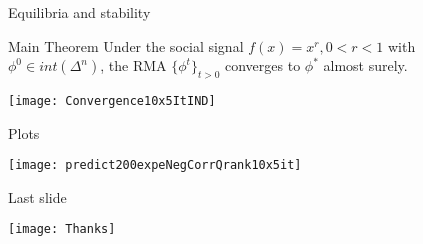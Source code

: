 
\begin{frame}[c]{Equilibria and stability}
\begin{exampleblock}{Main Theorem} 
\label{thm:ict} 
Under the social signal $f(x)=x^r, 0<r<1$ with $\phi^0\in
int(\Delta^n)$, the RMA $\{\phi^t\}_{t>0}$ converges to $\phi^*$
almost surely.
\end{exampleblock}

\begin{center}
\texttt{[image: Convergence10x5ItIND]}
\end{center}



\end{frame}



\begin{frame}[c]{Plots}
\begin{center}
\texttt{[image: predict200expeNegCorrQrank10x5it]}
\end{center}


\end{frame}



{	
\begin{frame}[c]{Last slide}
\begin{center}

	\vspace{10em}
	 \texttt{[image: Thanks]}\\
	\vspace{.5em}
	
\end{center}
\end{frame}
}



